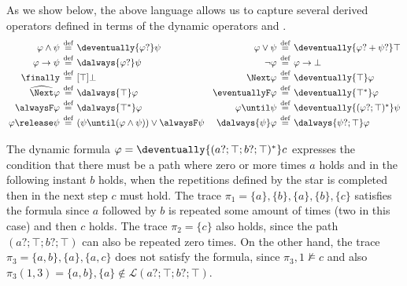 As we show below, the above language allows us to capture several derived operators defined in terms of the dynamic operators \deventually{\cdot} and \dalways{\cdot}.
\[
  \arraycolsep=2pt\def\arraystretch{1.3}
  \begin{array}{rclp{1pt}rcl}
    \varphi \wedge \psi & \defeq & \deventually{\varphi?} \psi          && \varphi \vee \psi & \defeq & \deventually{\varphi?+\psi?} \top
    \\
    \varphi \to \psi & \defeq & \dalways{\varphi?} \psi             && \neg \varphi & \defeq & \varphi \to \bot
    \\
    \finally & \defeq & [\top]\bot                               && 
    \Next \varphi & \defeq & \deventually{\top} \varphi 
    \\
    \wnext \varphi & \defeq & \dalways{\top} \varphi                && 
    \eventuallyF \varphi & \defeq & \deventually{\top^*} \varphi  
    \\
    \alwaysF \varphi & \defeq & \dalways{\top^*} \varphi            && 
    \varphi \until \psi & \defeq & \deventually{(\varphi?;\top)^*} \psi 
    \\
    \varphi \release \psi & \defeq & (\psi \until (\varphi \wedge \psi)) \vee \alwaysF \psi && \dalways{\psi}\varphi & \defeq & \dalways{\psi?;\top}\varphi
                                                
\end{array}
\]


\begin{example}
    The dynamic formula $\varphi=\deventually{(a? ; \top ;b? ; \top)^*}c$ expresses the condition that there must be a path where zero or more times $a$ holds and in the following instant $b$ holds, when the repetitions defined by the star is completed then in the next step $c$ must hold. The trace $\pi_1=\{a\},\{b\},\{a\},\{b\},\{c\}$ satisfies the formula since $a$ followed by $b$ is repeated some amount of times (two in this case) and then $c$ holds. The trace $\pi_2=\{c\}$ also holds, since the path $(a? ; \top ;b? ; \top)$  can also be repeated zero times. On the other hand, the trace $\pi_3=\{a,b\},\{a\},\{a,c\}$ does not satisfy the formula, since $\pi_3,1 \not\models c$ and also $\pi_3(1,3) = \{a,b\},\{a\} \notin \mathcal{L}(a? ; \top ;b? ; \top)$.
\end{example}